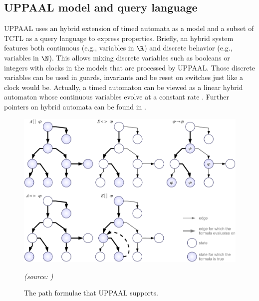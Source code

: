 
\subsection{UPPAAL model and query language}


UPPAAL uses an hybrid extension of timed automata as a model and a subset of TCTL as a query language to express properties. Briefly, an hybrid system \cite{alur97symbolic} features both continuous (e.g., variables in $\R$) and discrete behavior (e.g., variables in $\N$). This allows mixing discrete variables such as booleans or integers with clocks in the models that are processed by UPPAAL. Those discrete variables can be used in guards, invariants and be reset on switches just like a clock would be. Actually, a timed automaton can be viewed as a linear hybrid automaton whose continuous variables evolve at a constant rate \cite{alur97symbolic}. Further pointers on hybrid automata can be found in \cite{Miller00, HYTECH, ACHH93}. \\

\begin{figure}[htbp]
    \centering
    \includegraphics[width=\textwidth]{content/timed-automata/uppaal-path-formulae}
    \begin{flushright}
    	\textit{(source: \cite{UPPAAL})}
    \end{flushright}
    \caption{The path formulae that UPPAAL supports.}
    \label{fig:uppaal-path-formulae}
\end{figure}

